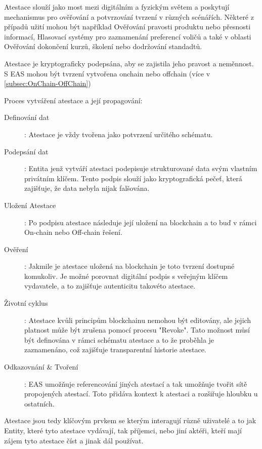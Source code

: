 Atestace slouží jako most mezi digitálním a fyzickým světem a poskytují mechanismus pro ověřování a potvrzování tvrzení v různých scénářích. Některé z případů užití mohou být například Ověřování pravosti produktu nebo přesnosti informací, Hlasovací systémy pro zaznamenání preferencí voličů a také v oblasti Ověřování dokončení kurzů, školení nebo dodržování standadtů.


Atestace je kryptograficky podepsána, aby se zajistila jeho pravost a neměnnost. S EAS mohou být tvrzení vytvořena onchain nebo offchain (více v \ref{subsec:OnChain-OffChain}) 

Proces vytváření atestace a její propagování:

\begin{description}
	
	\item[Definování dat]: Atestace je vždy tvořena jako potvrzení určitého schématu.
	
	\item[Podepsání dat]: Entita jenž vytváří atestaci podepisuje strukturované data svým vlastním privátním klíčem. Tento podpis slouží jako kryptografická pečeť, která zajišťuje, že data nebyla nijak falšována.
	
	\item[Uložení Atestace]: Po podpisu atestace následuje její uložení na blockchain a to buď v rámci On-chain nebo Off-chain řešení.
	
	\item[Ověření]: Jakmile je atestace uložená na blockchain je toto tvrzení dostupné komukoliv. Je možné porovnat digitální podpis s veřejným klíčem vydavatele, a to zajišťuje autenticitu takovéto atestace.
	
	\item[Životní cyklus]: Atestace kvůli principům blockchainu nemohou být editovány, ale jejich platnost může být zrušena pomocí procesu "Revoke". Tato možnost můsí být definována v rámci schématu atestace a to že proběhla je zaznamenáno, což zajišťuje transparentní historie atestace.
	
	\item[Odkazovnání \& Tvoření ]: EAS umožňuje referencování jiných atestací a tak umožňuje tvořit sítě propojených atestací. Toto přidáva kontext k atestaci a rozšiřuje hloubku u ostatních. 
	
\end{description}

Atestace jsou tedy klíčovým prvkem se kterým interagují různě uživatelé a to jak Entity, které tyto atestace vydávají, tak příjemci, nebo jiní aktéři, kteří mají zájem tyto atestace číst a jinak dál používat. \cite{EAS:Atestace}


